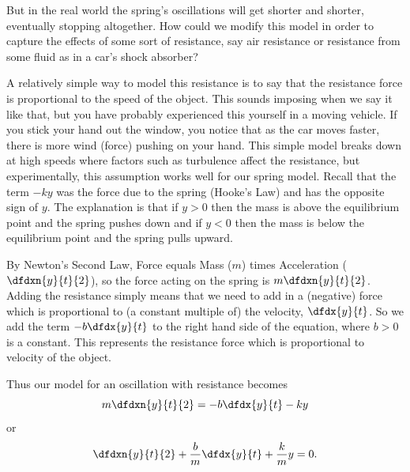But in the real world the spring's oscillations will get shorter and
shorter, eventually stopping altogether. How could we modify this
model in order to capture the effects of some sort of resistance, say
air resistance or resistance from some fluid as in a car's shock
absorber?

A relatively simple way to model this resistance is to say that the
resistance force is proportional to the speed of the object.  This
sounds imposing when we say it like that, but you have probably
experienced this yourself in a moving vehicle.  If you stick your hand
out the window, you notice that as the car moves faster, there is more
wind (force) pushing on your hand.  This simple model breaks down at
high speeds where factors such as turbulence affect the resistance,
but experimentally, this assumption works well for our spring model.
Recall that the term $-ky$ was the force due to the spring (Hooke's
Law) and has the opposite sign of $y.$ The explanation is that if
$y>0$ then the mass is above the equilibrium point and the spring
pushes down and if $y<0$ then the mass is below the equilibrium point
and the spring pulls upward.

By Newton's Second Law, Force equals Mass ($m$) times Acceleration
($\dfdxn{y}{t}{2}$), so the force acting on the spring is
$m\dfdxn{y}{t}{2}$. Adding the resistance simply means that we need to
add in a (negative) force which is proportional to (a constant
multiple of) the velocity, $\dfdx{y}{t}$. So we add the term
$-b\dfdx{y}{t}$ to the right hand side of the equation, where $b>0$ is
a constant.  This represents the resistance force which is
proportional to velocity of the object.

Thus our model for an oscillation with resistance becomes
$$
m\dfdxn{y}{t}{2}=-b\dfdx{y}{t}-ky
$$
or
\begin{equation}
\dfdxn{y}{t}{2}+\frac{b}{m}\dfdx{y}{t}+\frac{k}{m}y = 0.\label{eq:DampedOscillator}
\end{equation}



